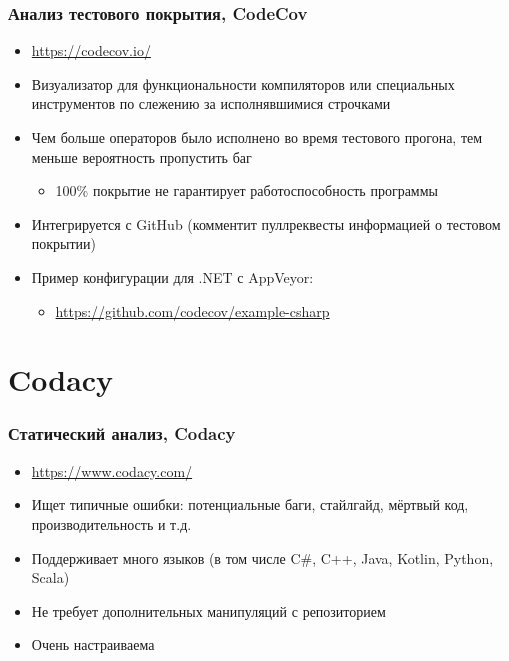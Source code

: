 \documentclass{../../slides-style}
\begin{document}
    \begin{frame}
        \frametitle{Анализ тестового покрытия, CodeCov}
        \begin{itemize}
            \item \url{https://codecov.io/}
            \item Визуализатор для функциональности компиляторов или специальных инструментов по слежению за исполнявшимися строчками
            \item Чем больше операторов было исполнено во время тестового прогона, тем меньше вероятность пропустить баг
            \begin{itemize}
                \item 100\% покрытие не гарантирует работоспособность программы
            \end{itemize}
            \item Интегрируется с GitHub (комментит пуллреквесты информацией о тестовом покрытии)
            \item Пример конфигурации для .NET с AppVeyor:
            \begin{itemize}
                \item \url{https://github.com/codecov/example-csharp}
            \end{itemize}
        \end{itemize}
    \end{frame}

    \section{Codacy}

    \begin{frame}
        \frametitle{Статический анализ, Codacy}
        \begin{itemize}
            \item \url{https://www.codacy.com/}
            \item Ищет типичные ошибки: потенциальные баги, стайлгайд, мёртвый код, производительность и т.д.
            \item Поддерживает много языков (в том числе C\#, C++, Java, Kotlin, Python, Scala)
            \item Не требует дополнительных манипуляций с репозиторием
            \item Очень настраиваема
        \end{itemize}
    \end{frame}
\end{document}
